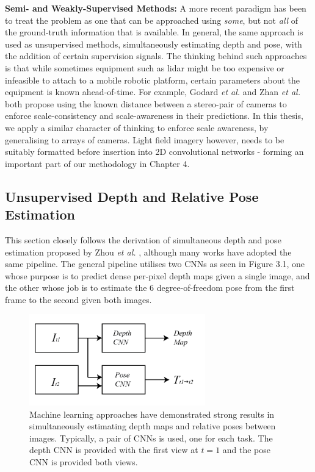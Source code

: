 \textbf{Semi- and Weakly-Supervised Methods: } A more recent paradigm has been to treat the problem as one that can be approached using \textit{some}, but not \textit{all} of the ground-truth information that is available. In general, the same approach is used as unsupervised methods, simultaneously estimating depth and pose, with the addition of certain supervision signals. The thinking behind such approaches is that while sometimes equipment such as lidar might be too expensive or infeasible to attach to a mobile robotic platform, certain parameters about the equipment is known ahead-of-time. For example, Godard \textit{et al.} \cite{godard2016consistency} and Zhan \textit{et al.} \cite{zhan2018deepfeature} both propose using the known distance between a stereo-pair of cameras to enforce scale-consistency and scale-awareness in their predictions. In this thesis, we apply a similar character of thinking to enforce scale awareness, by generalising to arrays of cameras. Light field imagery however, needs to be suitably formatted before insertion into 2D convolutional networks - forming an important part of our methodology in Chapter 4. 


\subsection{Unsupervised Depth and Relative Pose Estimation}
This section closely follows the derivation of simultaneous depth and pose estimation proposed by Zhou \textit{et al.} \cite{zhou2017unsupervised}, although many works have adopted the same pipeline. The general pipeline utilises two CNNs as seen in Figure 3.1, one whose purpose is to predict dense per-pixel depth maps given a single image, and the other whose job is to estimate the 6 degree-of-freedom pose from the first frame to the second given both images.

\begin{figure}[htbp]
    \centering
    \includegraphics[width=3in]{images/cnns.png}
    \caption[A pair of neural networks for learning depth and pose]{Machine learning approaches have demonstrated strong results in simultaneously estimating depth maps and relative poses between images. Typically, a pair of CNNs is used, one for each task. The depth CNN is provided with the first view at $t=1$ and the pose CNN is provided both views.}
    \label{2cnns}
\end{figure}


